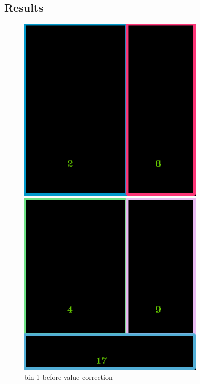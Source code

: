 \documentclass[11pt]{article}
\begin{document}
    \subsection{Results}
    \begin{figure}
    \begin{minipage}[htb]{0.33\linewidth}
    \centering
    \includegraphics[width=0.8\textwidth]{FIGS/1/output1.png}
    \caption{bin 1 before value correction}
    \label{skyline}
    \end{minipage}
    \begin{minipage}[htb]{0.33\linewidth}
    \centering
    \includegraphics[width=0.8\textwidth]{FIGS/1/output2.png}

\end{minipage}
\end{figure}
\end{document}
